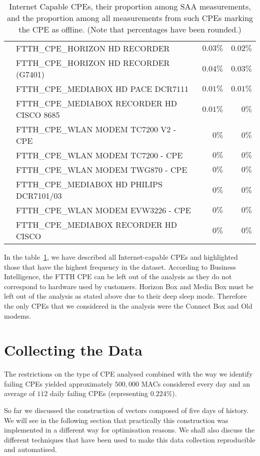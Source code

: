 \begin{table}[h]
\begin{center}
\begin{tabular}{c l r r}
									& FTTH\_CPE\_HORIZON HD RECORDER					& $0.03\%$ 				& $0.02\%$\\
									& FTTH\_CPE\_HORIZON HD RECORDER (G7401)			& $0.04\%$ 				& $0.03\%$\\
									& FTTH\_CPE\_MEDIABOX HD PACE DCR7111			& $0.01\%$ 				& $0.01\%$\\
									& FTTH\_CPE\_MEDIABOX RECORDER HD CISCO 8685	& $0.01\%$ 				& $0\%$\\
									& FTTH\_CPE\_WLAN MODEM TC7200 V2 - CPE			& $0\%$ 				& $0\%$\\
									& FTTH\_CPE\_WLAN MODEM TC7200 - CPE				& $0\%$ 				& $0\%$\\
									& FTTH\_CPE\_WLAN MODEM TWG870 - CPE				& $0\%$ 				& $0\%$\\
									& FTTH\_CPE\_MEDIABOX HD PHILIPS DCR7101/03		& $0\%$ 				& $0\%$\\
									& FTTH\_CPE\_WLAN MODEM EVW3226 - CPE			& $0\%$ 				& $0\%$\\
									& FTTH\_CPE\_MEDIABOX RECORDER HD CISCO			& $0\%$ 				& $0\%$\\

\end{tabular}
\end{center}
\caption{\label{CPEProportions}Internet Capable CPEs, their proportion among SAA measurements, and the proportion among all measurements from such CPEs marking the CPE as offline. (Note that percentages have been rounded.)}
\end{table}

In the table~\ref{CPEProportions}, we have described all Internet-capable CPEs and highlighted those that have the highest frequency in the dataset. According to Business Intelligence, the FTTH CPE can be left out of the analysis as they do not correspond to hardware used by customers. Horizon Box and Media Box must be left out of the analysis as stated above due to their deep sleep mode. Therefore the only CPEs that we considered in the analysis were the Connect Box and Old modems.

\section{Collecting the Data}
The restrictions on the type of CPE analysed combined with the way we identify failing CPEs yielded approximately $500,000$ MACs considered every day and an average of $112$ daily failing CPEs (representing $0.224\%$).

So far we discussed the construction of vectors composed of five days of history. We will see in the following section that practically this construction was implemented in a different way for optimisation reasons. We shall also discuss the different techniques that have been used to make this data collection reproducible and automatised. 

